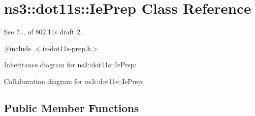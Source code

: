 \hypertarget{classns3_1_1dot11s_1_1IePrep}{}\section{ns3\+:\+:dot11s\+:\+:Ie\+Prep Class Reference}
\label{classns3_1_1dot11s_1_1IePrep}


See 7... of 802.\+11s draft 2..  




{\ttfamily \#include $<$ie-\/dot11s-\/prep.\+h$>$}



Inheritance diagram for ns3\+:\+:dot11s\+:\+:Ie\+Prep\+:


Collaboration diagram for ns3\+:\+:dot11s\+:\+:Ie\+Prep\+:
\subsection*{Public Member Functions}
